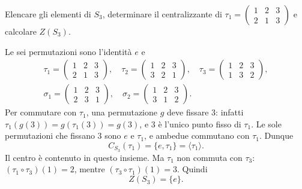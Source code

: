 \begin{esercizio}
Elencare gli elementi di $S_3$, determinare il centralizzante di
$\tau_1=\left(\begin{smallmatrix}1&2&3\\2&1&3\end{smallmatrix}\right)$ e calcolare $Z(S_3)$.
\end{esercizio}
\begin{svolgimento}
Le sei permutazioni sono l'identità $e$ e
\[
\begin{gathered}
\tau_1=\begin{pmatrix}1&2&3\\2&1&3\end{pmatrix},\quad
\tau_2=\begin{pmatrix}1&2&3\\3&2&1\end{pmatrix},\quad
\tau_3=\begin{pmatrix}1&2&3\\1&3&2\end{pmatrix},\\
\sigma_1=\begin{pmatrix}1&2&3\\2&3&1\end{pmatrix},\quad
\sigma_2=\begin{pmatrix}1&2&3\\3&1&2\end{pmatrix}.
\end{gathered}
\]
Per commutare con $\tau_1$, una permutazione $g$ deve fissare $3$: infatti $\tau_1(g(3))=g(\tau_1(3))=g(3)$, e $3$ è l'unico punto fisso di $\tau_1$. Le sole permutazioni che fissano $3$ sono $e$ e $\tau_1$, e ambedue commutano con $\tau_1$. Dunque
\[
C_{S_3}(\tau_1)=\{e,\tau_1\}=\langle\tau_1\rangle.
\]
Il centro è contenuto in questo insieme. Ma $\tau_1$ non commuta con $\tau_3$: $(\tau_1\circ\tau_3)(1)=2$, mentre $(\tau_3\circ\tau_1)(1)=3$. Quindi
\[
Z(S_3)=\{e\}.
\]
\end{svolgimento}
